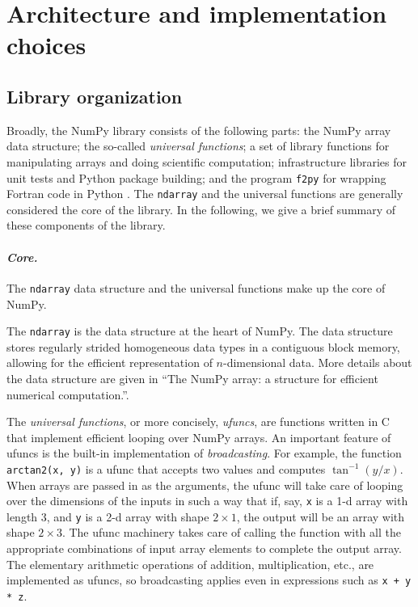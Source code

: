 \documentclass[fleqn,10pt]{wlscirep}
\newcommand{\code}[1]{\texttt{#1}}
\begin{document}


\section*{Architecture and implementation choices}

\subsection*{Library organization}
Broadly, the NumPy library consists of the following parts:
the NumPy array data structure; the so-called \emph{universal functions};
a set of library functions for manipulating arrays and doing scientific
computation; infrastructure libraries for unit tests and Python package
building; and the program \code{f2py} for wrapping Fortran code in Python \cite{peterson2009f2py}.
The \code{ndarray} and the universal functions are generally considered
the core of the library.
In the following, we give a brief summary of these components of the
library.

\paragraph{\emph{Core.}}  The \code{ndarray} data structure and the
universal functions make up the core of NumPy.

The \code{ndarray} is the data structure at the heart of NumPy.
The data structure stores regularly strided homogeneous data types
in a contiguous block memory, allowing for the efficient representation
of $n$-dimensional data.
More details about the data structure are given in ``The NumPy array:
a structure for efficient numerical computation.''\cite{vanderwalt2011numpy}.

The \emph{universal functions}, or more concisely, \emph{ufuncs},
are functions written in C that implement efficient looping over
NumPy arrays. An important feature of ufuncs is the built-in
implementation of \emph{broadcasting}.  For example, the function
\code{arctan2(x, y)} is a ufunc that accepts two values and computes
$\tan^{-1}(y/x)$.  When arrays are passed in as the arguments,
the ufunc will take care of looping over the dimensions of the inputs
in such a way that if, say, \code{x} is a 1-d array with length 3, and
\code{y} is a 2-d array with shape $2 \times 1$, the output will be
an array with shape $2 \times 3$.  The ufunc machinery takes care
of calling the function with all the appropriate combinations of
input array elements to complete the output array.
The elementary arithmetic operations of addition, multiplication, etc.,
are implemented as ufuncs, so broadcasting applies even in expressions
such as \code{x + y * z}.
\end{document}
